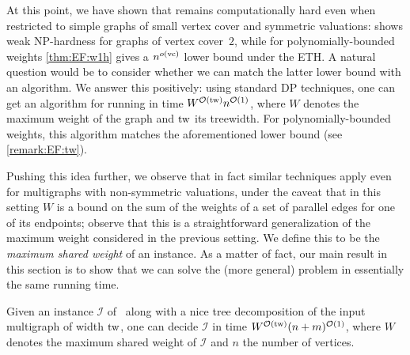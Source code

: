 At this point, we have shown that {\EFo} remains computationally hard even when restricted to simple graphs of small vertex cover and symmetric valuations:
 shows weak NP-hardness for graphs of vertex cover~$2$,
while for polynomially-bounded weights \cref{thm:EF:w1h} gives a $n^{o(\mathrm{vc})}$ lower bound under the ETH.
A natural question would be to consider whether we can match the latter lower bound with an algorithm.
We answer this positively: using standard DP techniques, one can get an algorithm for {\EFo} running in time $W^{\mathcal{O}(\mathrm{tw})} n^{\mathcal{O}(1)}$,
where $W$ denotes the maximum weight of the graph and $\mathrm{tw}$ its treewidth.
For polynomially-bounded weights, this algorithm matches the aforementioned lower bound (see \cref{remark:EF:tw}).

Pushing this idea further, we observe that in fact similar techniques apply even for multigraphs with non-symmetric valuations,
under the caveat that in this setting $W$ is a bound on the
sum of the weights of a set of parallel edges for one of its endpoints; observe that this is a straightforward generalization of the maximum weight considered in the previous setting.
We define this to be the \emph{maximum shared weight} of an instance.
As a matter of fact, our main result in this section is to show that we can solve the (more general) {\EFmc} problem in essentially the same running time.


\begin{theoremrep}[\appsymb]\label{thm:ef:fpt_tw}
    Given an instance $\mathcal{I}$ of \EFmc\ along with a nice tree decomposition of the input multigraph of width $\mathrm{tw}$,
    one can decide $\mathcal{I}$ in time $W^{\mathcal{O}(\mathrm{tw})} (n+m)^{\mathcal{O}(1)}$,
    where $W$ denotes the maximum shared weight of $\mathcal{I}$ and $n$ the number of vertices.
\end{theoremrep}

